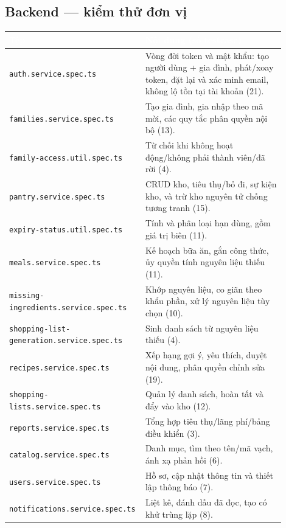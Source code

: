 \documentclass[12pt,a4paper]{article}
\newcommand{\fpath}[1]{\nolinkurl{#1}}
\newcommand{\thead}[1]{\textbf{\textcolor{white}{#1}}}
\begin{document}
\subsection{Backend --- kiểm thử đơn vị}
\begin{longtable}{|>{\raggedright\arraybackslash}p{0.40\linewidth}|>{\raggedright\arraybackslash}p{0.50\linewidth}|}
\hline
\rowcolor{headerblue}
\thead{Tệp} & \thead{Nội dung (số testcase)} \\
\hline
\endhead
\fpath{auth.service.spec.ts} & Vòng đời token và mật khẩu: tạo người dùng + gia đình, phát/xoay token, đặt lại và xác minh email, không lộ tồn tại tài khoản (21). \\
\hline
\fpath{families.service.spec.ts} & Tạo gia đình, gia nhập theo mã mời, các quy tắc phân quyền nội bộ (13). \\
\hline
\fpath{family-access.util.spec.ts} & Từ chối khi không hoạt động/không phải thành viên/đã rời (4). \\
\hline
\fpath{pantry.service.spec.ts} & CRUD kho, tiêu thụ/bỏ đi, sự kiện kho, và trừ kho nguyên tử chống tương tranh (15). \\
\hline
\fpath{expiry-status.util.spec.ts} & Tính và phân loại hạn dùng, gồm giá trị biên (11). \\
\hline
\fpath{meals.service.spec.ts} & Kế hoạch bữa ăn, gắn công thức, ủy quyền tính nguyên liệu thiếu (11). \\
\hline
\fpath{missing-ingredients.service.spec.ts} & Khớp nguyên liệu, co giãn theo khẩu phần, xử lý nguyên liệu tùy chọn (10). \\
\hline
\fpath{shopping-list-generation.service.spec.ts} & Sinh danh sách từ nguyên liệu thiếu (4). \\
\hline
\fpath{recipes.service.spec.ts} & Xếp hạng gợi ý, yêu thích, duyệt nội dung, phân quyền chỉnh sửa (19). \\
\hline
\fpath{shopping-lists.service.spec.ts} & Quản lý danh sách, hoàn tất và đẩy vào kho (12). \\
\hline
\fpath{reports.service.spec.ts} & Tổng hợp tiêu thụ/lãng phí/bảng điều khiển (3). \\
\hline
\fpath{catalog.service.spec.ts} & Danh mục, tìm theo tên/mã vạch, ánh xạ phản hồi (6). \\
\hline
\fpath{users.service.spec.ts} & Hồ sơ, cập nhật thông tin và thiết lập thông báo (7). \\
\hline
\fpath{notifications.service.spec.ts} & Liệt kê, đánh dấu đã đọc, tạo có khử trùng lặp (8). \\

\end{longtable}
\end{document}
